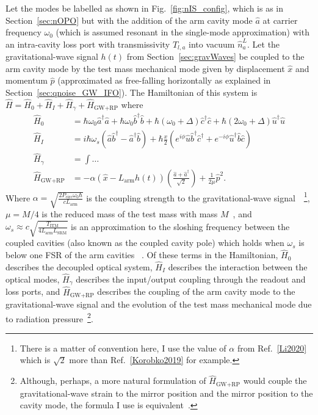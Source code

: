 Let the modes be labelled as shown in Fig.~\ref{fig:nIS_config}, which is as in Section~\ref{sec:nOPO} but with the addition of the arm cavity mode $\hat a$ at carrier frequency $\omega_0$ (which is assumed resonant in the single-mode approximation) with an intra-cavity loss port with transmissivity $T_{l,a}$ into vacuum $\hat n^L_a$. Let the gravitational-wave signal $h(t)$ from Section~\ref{sec:gravWaves} be coupled to the arm cavity mode by the test mass mechanical mode given by displacement $\hat x$ and momentum $\hat p$ (approximated as free-falling horizontally as explained in Section~\ref{sec:qnoise_GW_IFO}).
The Hamiltonian of this system is $\hat H = \hat H_0 + \hat H_I + \hat H_\gamma + \hat H_\text{GW+RP}$ where~\cite{} 
\begin{align}
\hat H_0 &= \hbar \omega_0 \hat a^\dag \hat a + \hbar \omega_0 \hat b^\dag \hat b+ \hbar (\omega_0+\Delta) \hat c^\dag \hat c + \hbar (2\omega_0+\Delta) \hat u^\dag \hat u\\
\hat H_I &= i\hbar\omega_s(\hat a\hat b^\dag-\hat a^\dag\hat b) + \hbar \frac{x}{2} (e^{i\phi} \hat u \hat b^\dag \hat c^\dag+e^{-i\phi} \hat u^\dag \hat b \hat c) \\
\hat H_\gamma &= \int \ldots \\
\hat H_\text{GW+RP} &= -\alpha (\hat{x}-L_\mathrm{arm}h(t))\left(\frac{\hat{a}+\hat{a}^\dag}{\sqrt{2}}\right)+\frac{1}{2\mu}\hat{p}^2.
\end{align}
Where $\alpha=\sqrt{\frac{2 P_\text{circ} \omega_0 \hbar}{c  L_\text{arm}}}$ is the coupling strength to the gravitational-wave signal~\cite{Li2020}~\footnote{There is a matter of convention here, I use the value of $\alpha$ from Ref.~\ref{Li2020} which is $\sqrt2$ more than Ref.~\ref{Korobko2019} for example. }, $\mu=M/4$ is the reduced mass  of the test mass with mass $M$~\cite{}, and $\omega_s\approx c\sqrt{\frac{T_\text{ITM}}{4 L_\text{arm} L_\text{SRM}}}$ is an approximation to the sloshing frequency between the coupled cavities (also known as the coupled cavity pole) which holds when $\omega_s$ is below one FSR of the arm cavities ~\cite{}.
Of these terms in the Hamiltonian, $\hat H_0$ describes the decoupled optical system, $\hat H_I$ describes the interaction between the optical modes, $\hat H_\gamma$ describes the input/output coupling through the readout and loss ports, and $\hat H_\text{GW+RP}$ describes the coupling of the arm cavity mode to the gravitational-wave signal and the evolution of the test mass mechanical mode due to  radiation pressure~\footnote{Although, perhaps, a more natural formulation of $\hat H_\text{GW+RP}$ would couple the gravitational-wave strain to the mirror position and the mirror position to the cavity mode, the formula I use is equivalent~\cite{}.}.
